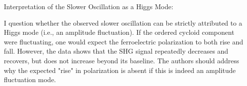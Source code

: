 Interpretation of the Slower Oscillation as a Higgs Mode:

I question whether the observed slower oscillation can be strictly attributed to a Higgs mode (i.e., an amplitude fluctuation). If the ordered cycloid component were fluctuating, one would expect the ferroelectric polarization to both rise and fall. However, the data shows that the SHG signal repeatedly decreases and recovers, but does not increase beyond its baseline. The authors should address why the expected "rise" in polarization is absent if this is indeed an amplitude fluctuation mode. 

